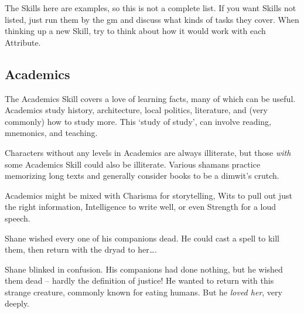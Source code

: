 \begin{multicols}{2}
The Skills here are examples, so this is not a complete list.
If you want Skills not listed, just run them by the \gls{gm} and discuss what kinds of tasks they cover.
When thinking up a new Skill, try to think about how it would work with each Attribute.

\subsection{Academics}

The Academics Skill covers a love of learning facts, many of which can be useful.
Academics study history, architecture, local politics, literature, and (very commonly) how to study more.
This `study of study', can involve reading, mnemonics, and teaching.


Characters without any levels in Academics are always illiterate, but those \emph{with} some Academics Skill could also be illiterate.
Various shamans practice memorizing long texts and generally consider books to be a dimwit's crutch.

Academics might be mixed with Charisma for storytelling, Wits to pull out just the right information, Intelligence to write well, or even Strength for a loud speech.

\begin{exampletext}

  Shane wished every one of his companions dead.
  He could cast a spell to kill them, then return with the dryad to her\ldots.

  Shane blinked in confusion. 
  His companions had done nothing, but he wished them dead -- hardly the definition of justice!
  He wanted to return with this strange creature, commonly known for eating humans.
  But he \emph{loved her}, very deeply.


\end{exampletext}
\end{multicols}
